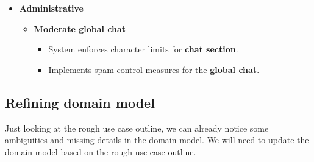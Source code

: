 \documentclass[]{VUMIFTemplateClass}
\begin{document}
\begin{itemize}
    \item \textbf{Administrative}
    \begin{itemize}
        \item \textbf{Moderate global chat}
        \begin{itemize}
            \item System enforces character limits for \textbf{chat section}.
            \item Implements spam control measures for the \textbf{global chat}.
        \end{itemize}
    \end{itemize}
\end{itemize}

\subsection{Refining domain model}
Just looking at the rough use case outline, we can already notice some ambiguities and missing details in the domain model.
We will need to update the domain model based on the rough use case outline.
\end{document}
